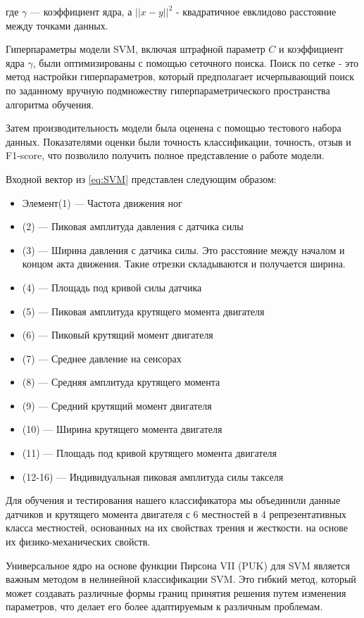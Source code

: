 где $\gamma$ --- коэффициент ядра, а $||x - y||^2$ - квадратичное евклидово расстояние между точками данных.

Гиперпараметры модели SVM, включая штрафной параметр $C$ и коэффициент ядра $\gamma$, были оптимизированы с помощью сеточного поиска. Поиск по сетке - это метод настройки гиперпараметров, который предполагает исчерпывающий поиск по заданному вручную подмножеству гиперпараметрического пространства алгоритма обучения.

Затем производительность модели была оценена с помощью тестового набора данных. Показателями оценки были точность классификации, точность, отзыв и F1-score, что позволило получить полное представление о работе модели.

Входной вектор из \eqref{eq:SVM} представлен следующим образом:
\begin{itemize}
    \item Элемент(1) --- Частота движения ног
    \item (2) --- Пиковая амплитуда давления с датчика силы
    \item (3) --- Ширина давления с датчика силы. Это расстояние между началом и концом акта движения. Такие отрезки складываются и получается ширина.
    \item (4) --- Площадь под кривой силы датчика
    \item (5) --- Пиковая амплитуда крутящего момента двигателя
    \item (6) --- Пиковый крутящий момент двигателя
    \item (7) --- Среднее давление на сенсорах
    \item (8) --- Средняя амплитуда крутящего момента
    \item (9) --- Средний крутящий момент двигателя
    \item (10) --- Ширина крутящего момента двигателя
    \item (11) --- Площадь под кривой крутящего момента двигателя
    \item (12-16) --- Индивидуальная пиковая амплитуда силы такселя 
\end{itemize}

Для обучения и тестирования нашего классификатора мы объединили данные датчиков и крутящего момента двигателя с 6 местностей в 4 репрезентативных класса местностей, основанных на их свойствах трения и жесткости.
на основе их физико-механических свойств.

Универсальное ядро на основе функции Пирсона VII (PUK) для SVM является важным методом в нелинейной классификации SVM. Это гибкий метод, который может создавать различные формы границ принятия решения путем изменения параметров, что делает его более адаптируемым к различным проблемам.

